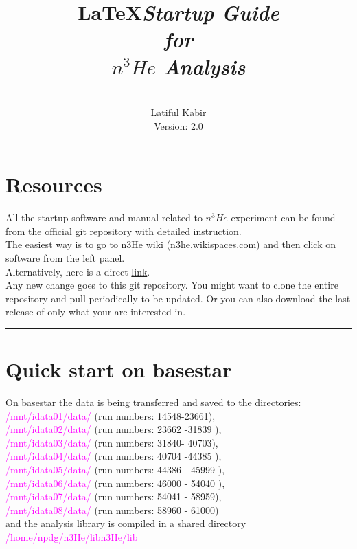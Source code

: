\documentclass[12pt]{article}
\title{\LaTeX}
\date{}
\title{\emph{\huge\textbf{Startup Guide \\ for \\$n^3He$ Analysis}}
}
\author{\\Latiful Kabir\\
Version: 2.0
}
\begin{document}
  \maketitle
  
\newpage  
\tableofcontents
\newpage
\setcounter{tocdepth}{2}

\section{Resources}
All the startup software and manual related to $n^3He$ experiment can be found from the official git repository with detailed instruction. \\
The easiest way is to go to n3He wiki (n3he.wikispaces.com) and then click on software from the left panel.  \\
Alternatively, here is a direct \href{http://latifkabir.github.io/n3He_Soft/}{link}.\\
Any new change goes to this  git repository. You might want to clone the entire repository and pull periodically to be updated. Or you can also download the last release of only what your are interested in.  

\noindent
{\color{red} \rule{\linewidth}{1mm} }
 
\newpage
\section{Quick start on basestar}
On basestar the data is being transferred and saved to the directories: \\ \textcolor{magenta}{ /mnt/idata01/data/ } (run numbers: 14548-23661),\\ \textcolor{magenta}{ /mnt/idata02/data/ } (run numbers: 23662 -31839 ),\\ \textcolor{magenta}{ /mnt/idata03/data/ } (run numbers: 31840- 40703),\\ \textcolor{magenta}{ /mnt/idata04/data/ } (run numbers: 40704 -44385 ),\\ \textcolor{magenta}{ /mnt/idata05/data/ } (run numbers: 44386 - 45999 ),\\ \textcolor{magenta}{ /mnt/idata06/data/ } (run numbers: 46000 - 54040 ),\\ \textcolor{magenta}{ /mnt/idata07/data/ } (run numbers: 54041 - 58959),\\ \textcolor{magenta}{ /mnt/idata08/data/ } (run numbers: 58960 - 61000)\\and the analysis library is compiled in a shared directory \textcolor{magenta}{ /home/npdg/n3He/libn3He/lib} \\
\end{document}
